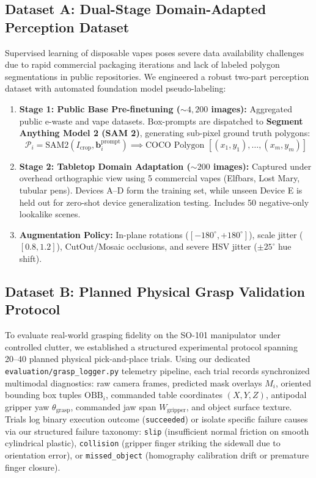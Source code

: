 \documentclass[10pt,a4paper]{article}
\begin{document}
\subsection{Dataset A: Dual-Stage Domain-Adapted Perception Dataset}
Supervised learning of disposable vapes poses severe data availability challenges due to rapid commercial packaging iterations and lack of labeled polygon segmentations in public repositories. We engineered a robust two-part perception dataset with automated foundation model pseudo-labeling:
\begin{enumerate}
    \item \textbf{Stage 1: Public Base Pre-finetuning (${\sim}4{,}200$ images):} Aggregated public e-waste and vape datasets. Box-prompts are dispatched to \textbf{Segment Anything Model 2 (SAM 2)}, generating sub-pixel ground truth polygons:
    \begin{equation}
        \mathcal{P}_i = \text{SAM2}\left(I_{\text{crop}}, \mathbf{b}_i^{\text{prompt}}\right) \implies \text{COCO Polygon } [(x_1, y_1), \dots, (x_m, y_m)]
    \end{equation}
    \item \textbf{Stage 2: Tabletop Domain Adaptation (${\sim}200$ images):} Captured under overhead orthographic view using 5 commercial vapes (Elfbars, Lost Mary, tubular pens). Devices A--D form the training set, while unseen Device E is held out for zero-shot device generalization testing. Includes 50 negative-only lookalike scenes.
    \item \textbf{Augmentation Policy:} In-plane rotations ($[-180^\circ, +180^\circ]$), scale jitter ($[0.8, 1.2]$), CutOut/Mosaic occlusions, and severe HSV jitter ($\pm 25^\circ$ hue shift).
\end{enumerate}

\newpage

\subsection{Dataset B: Planned Physical Grasp Validation Protocol}
To evaluate real-world grasping fidelity on the SO-101 manipulator under controlled clutter, we established a structured experimental protocol spanning 20--40 planned physical pick-and-place trials. Using our dedicated \texttt{evaluation/grasp\_logger.py} telemetry pipeline, each trial records synchronized multimodal diagnostics: raw camera frames, predicted mask overlays $M_i$, oriented bounding box tuples $\text{OBB}_i$, commanded table coordinates $(X, Y, Z)$, antipodal gripper yaw $\theta_{\text{grasp}}$, commanded jaw span $W_{\text{gripper}}$, and object surface texture. Trials log binary execution outcome (\texttt{succeeded}) or isolate specific failure causes via our structured failure taxonomy: \texttt{slip} (insufficient normal friction on smooth cylindrical plastic), \texttt{collision} (gripper finger striking the sidewall due to orientation error), or \texttt{missed\_object} (homography calibration drift or premature finger closure).
\end{document}
